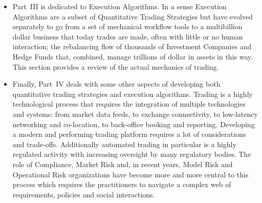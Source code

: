 \begin{itemize}
\item Part~III is dedicated to Execution Algorithms. In a sense Execution Algorithms are a subset of Quantitative Trading Strategies but have evolved separately to go from a set of mechanical workflow tools to a multibillion dollar business that today trades are made, often with little or no human interaction; the rebalancing flow of thousands of Investment Companies and Hedge Funds that, combined, manage trillions of dollar in assets in this way. This section provides a review of the actual mechanics of trading. 

\item Finally, Part~IV deals with some other aspects of developing both quantitative trading strategies and execution algorithms. Trading is a highly technological process that requires the integration of multiple technologies and systems: from market data feeds, to exchange connectivity, to low-latency networking and co-location, to back-office booking and reporting. Developing a modern and performing trading platform requires a lot of considerations and trade-offs. Additionally automated trading in particular is a highly regulated activity with increasing oversight by many regulatory bodies. The role of Compliance, Market Risk and, in recent years, Model Risk and Operational Risk organizations have become more and more central to this process which requires the practitioners to navigate a  complex web of requirements, policies and social interactions.
\end{itemize}
